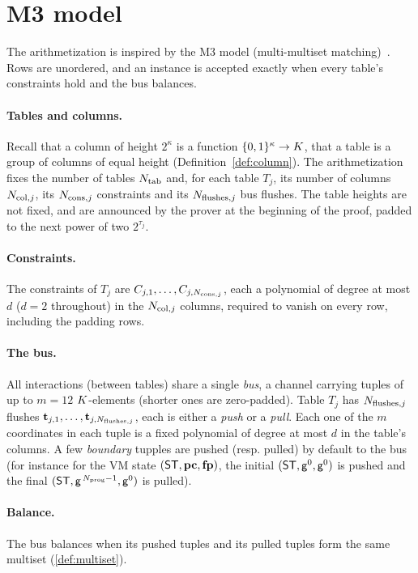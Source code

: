 \section{M3 model}\label{sec:m3}

The arithmetization is inspired by the M3 model (multi-multiset matching)~\cite{m3}. Rows are unordered, and an instance is accepted exactly when every table's constraints hold and the bus balances.

\paragraph{Tables and columns.} Recall that a column of height $2^{\kappa}$ is a function $\{0,1\}^{\kappa}\to K$, that a table is a group of columns of equal height (Definition~\ref{def:column}). The arithmetization fixes the number of tables $N_{\mathrm{tab}}$ and, for each table $T_j$, its number of columns $N_{\mathrm{col},j}$, its $N_{\mathrm{cons},j}$ constraints and its $N_{\mathrm{flushes},j}$ bus flushes. The table heights are not fixed, and are announced by the prover at the beginning of the proof, padded to the next power of two $2^{\tau_j}$.

\paragraph{Constraints.} The constraints of $T_j$ are $C_{j,1},\dots,C_{j,N_{\mathrm{cons},j}}$, each a polynomial of degree at most $d$ ($d=2$ throughout) in the $N_{\mathrm{col},j}$ columns, required to vanish on every row, including the padding rows.

\paragraph{The bus.} All interactions (between tables) share a single \emph{bus}, a channel carrying tuples of up to $m=12$ $K$-elements (shorter ones are zero-padded). Table $T_j$ has $N_{\mathrm{flushes},j}$ flushes $\mathbf{t}_{j,1},\dots,\mathbf{t}_{j,N_{\mathrm{flushes},j}}$, each is either a \emph{push} or a \emph{pull}. Each one of the $m$ coordinates in each tuple is a fixed polynomial of degree at most $d$ in the table's columns. A few \emph{boundary} tupples are pushed (resp. pulled) by default to the bus (for instance for the VM state $(\mathsf{ST}, \mathbf{pc}, \mathbf{fp})$, the initial $(\mathsf{ST}, \mathsf{g}^0, \mathsf{g}^0)$ is pushed and the final $(\mathsf{ST}, \mathsf{g}^{\,N_{\mathrm{prog}}-1}, \mathsf{g}^{0})$ is pulled).

\paragraph{Balance.} The bus balances when its pushed tuples and its pulled tuples form the same multiset (\ref{def:multiset}).


